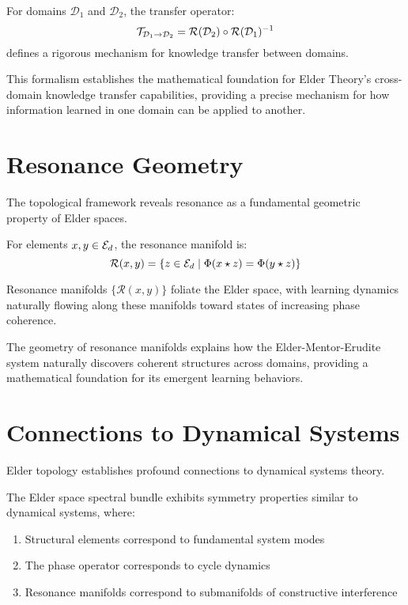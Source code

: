 \begin{corollary}
For domains $\mathcal{D}_1$ and $\mathcal{D}_2$, the transfer operator:
\begin{equation}
\mathcal{T}_{\mathcal{D}_1 \rightarrow \mathcal{D}_2} = \mathcal{R}(\mathcal{D}_2) \circ \mathcal{R}(\mathcal{D}_1)^{-1}
\end{equation}
defines a rigorous mechanism for knowledge transfer between domains.
\end{corollary}

This formalism establishes the mathematical foundation for Elder Theory's cross-domain knowledge transfer capabilities, providing a precise mechanism for how information learned in one domain can be applied to another.

\section{Resonance Geometry}

The topological framework reveals resonance as a fundamental geometric property of Elder spaces.

\begin{definition}
For elements $x, y \in \mathcal{E}_{d}$, the resonance manifold is:
\begin{equation}
\mathcal{R}(x, y) = \{z \in \mathcal{E}_{d} \mid \Phi(x \star z) = \Phi(y \star z)\}
\end{equation}
\end{definition}

\begin{theorem}
Resonance manifolds $\{\mathcal{R}(x, y)\}$ foliate the Elder space, with learning dynamics naturally flowing along these manifolds toward states of increasing phase coherence.
\end{theorem}

The geometry of resonance manifolds explains how the Elder-Mentor-Erudite system naturally discovers coherent structures across domains, providing a mathematical foundation for its emergent learning behaviors.

\section{Connections to Dynamical Systems}

Elder topology establishes profound connections to dynamical systems theory.

\begin{theorem}
The Elder space spectral bundle exhibits symmetry properties similar to dynamical systems, where:
\begin{enumerate}
    \item Structural elements correspond to fundamental system modes
    \item The phase operator corresponds to cycle dynamics
    \item Resonance manifolds correspond to submanifolds of constructive interference
\end{enumerate}
\end{theorem}

